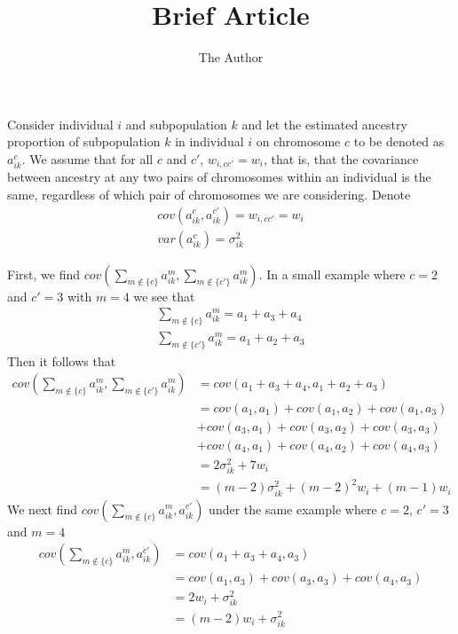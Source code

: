 \documentclass[11pt]{article} %
\title{Brief Article}
\author{The Author}
\begin{document}
Consider individual $i$ and subpopulation $k$ and let the estimated ancestry proportion of subpopulation $k$ in individual $i$ on chromosome $c$ to be denoted as $a_{ik}^c$.
We assume that for all $c$ and $c'$, $w_{i,cc'}=w_i$, that is, that the covariance between ancestry at any two pairs of chromosomes within an individual is the same, regardless of which pair of chromosomes we are considering.
Denote 
\begin{align}
cov(a_{ik}^c,a_{ik}^{c'})=w_{i,cc'}=w_i\\
var(a_{ik}^c)=\sigma^2_{ik}\end{align}

First, we find $cov(\sum_{m \notin\{c\}}a_{ik}^{m}, \sum_{m\notin \{c'\}}a_{ik}^{m})$.
In a small example where $c=2$ and $c'=3$ with $m=4$ we see that 
\begin{align}
\sum_{m \notin\{c\}}a_{ik}^{m} = a_1+a_3+a_4  \\
\sum_{m \notin\{c'\}}a_{ik}^{m} = a_1+a_2+a_3
\end{align}
Then it follows that
\begin{align}
cov(\sum_{m \notin\{c\}}a_{ik}^{m}, \sum_{m\notin \{c'\}}a_{ik}^{m}) &=cov(a_1+a_3+a_4, a_1+a_2+a_3)\\
&=cov(a_1,a_1)+cov(a_1,a_2)+cov(a_1,a_3)\\
&+cov(a_3,a_1)+cov(a_3,a_2)+cov(a_3,a_3)\\
&+cov(a_4,a_1)+cov(a_4,a_2)+cov(a_4,a_3)\\
&=2\sigma^2_{ik}+7w_{i}\\
&=(m-2)\sigma^2_{ik}+(m-2)^2w_{i}+(m-1)w_{i} \label{sumsum}
\end{align}
We next find $cov(\sum_{m\notin \{c\}}a_{ik}^{m}, a_{ik}^{c'})$ under the same example where $c=2$, $c'=3$ and $m=4$
\begin{align}
cov(\sum_{m\notin \{c\}}a_{ik}^{m}, a_{ik}^{c'})&=cov(a_1+a_3+a_4,a_3)\\
&=cov(a_1,a_3)+cov(a_3,a_3)+cov(a_4,a_3)\\
&=2w_{i}+\sigma^2_{ik}\\
&=(m-2)w_{i}+\sigma^2_{ik} \label{sumsing}
\end{align}
\end{document}
